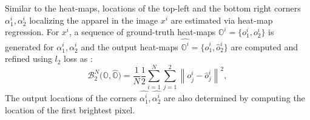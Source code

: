 \documentclass[conference]{IEEEtran}
\DeclareMathOperator*{\argmaxB}{argmax}
\newcommand\norm[1]{\left\lVert#1\right\rVert}
\begin{document}
Similar to the heat-maps, locations of the top-left and the bottom right corners $\alpha^i_1,\alpha^i_2$ localizing the apparel in the image $x^i$ are estimated via heat-map regression. For $x^i$, a sequence of ground-truth heat-maps $\mathbb{O}^i= \{ o^i_1, o^i_2 \}$ is generated for $\alpha^i_1, \alpha^i_2$ and the output heat-maps $\hat{\mathbb{O}^i}= \{ \hat{o}^i_1, \hat{o}^i_2 \}$ are computed and refined using $l_2$ loss as :
% 
\begin{equation}
\mathcal{B}^{N}_2 \big( \mathbb{O} , \hat{\mathbb{O}}\big) = \frac{1}{N}\frac{1}{2} \sum_{i = 1}^{N} \sum_{j = 1}^{2} \norm{ o^i_{j} - \hat{o}^i_j }^2,
\end{equation}
% 
The output locations of the corners  $\hat{\alpha^i_1}, \hat{\alpha^i_2}$ are also determined by computing the location of the first brightest pixel.
% 
%
\end{document}
